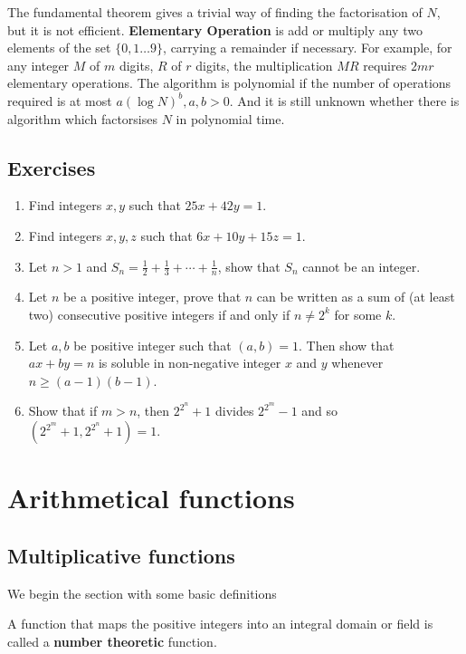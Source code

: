 The fundamental theorem gives a trivial way of finding the factorisation of $N$, but it is not efficient. {\bf Elementary Operation} is add or multiply any two elements of the set $\{0,1 \ldots 9\}$, carrying a remainder if necessary. For example, for any integer $M$ of $m$ digits, $R$ of $r$ digits, the multiplication $MR$ requires $2mr$ elementary operations. The algorithm is polynomial if the number of operations required is at most $a(\log N)^b, a ,b >0$. And it is still unknown whether there is algorithm which factorsises $N$ in polynomial time.

\subsection{Exercises}

\begin{enumerate}
\item Find integers $x, y$ such that $25x + 42y=1$.
\item Find integers $x, y, z$ such that $6x + 10y +15z =1$.
\item Let $n>1$ and $S_n = \frac{1}{2} + \frac{1}{3} + \cdots +\frac{1}{n}$, show that $S_n$ cannot be an integer.
\item Let $n$ be a positive integer, prove that $n$ can be written as a sum of (at least two) consecutive positive integers if and only if $n \neq 2^k$ for some $k$.
\item Let $a, b$ be positive integer such that $(a,b)=1$. Then show that $ax + by=n$ is soluble in non-negative integer $x$ and $y$ whenever $n \ge (a-1)(b-1)$.
\item Show that if $m > n$, then $2^{2^n}+1$ divides $2^{2^m}-1$ and so $(2^{2^m}+1, 2^{2^n} +1)=1$.\\
\end{enumerate}


\section{Arithmetical functions}

\subsection{Multiplicative functions}

We begin the section with some basic definitions

\begin{definition} 
A function that maps the positive integers into an integral domain or field is called a {\bf number theoretic} function.
\end{definition}

